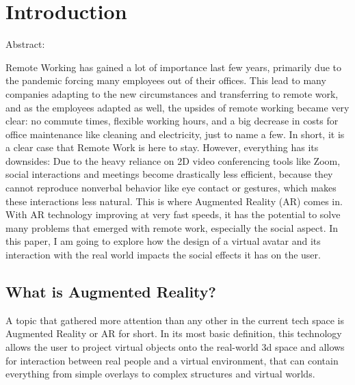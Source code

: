 \chapter{Introduction}
\label{sec::introduction}

Abstract:

Remote Working has gained a lot of importance last few years, primarily due to the pandemic forcing many employees out of their offices. This lead to many companies adapting to the new circumstances and transferring to remote work, and as the employees adapted as well, the upsides of remote working became very clear: no commute times, flexible working hours, and a big decrease in costs for office maintenance like cleaning and electricity, just to name a few. In short, it is a clear case that Remote Work is here to stay. However, everything has its downsides: Due to the heavy reliance on 2D video conferencing tools like Zoom, social interactions and meetings become drastically less efficient, because they cannot reproduce nonverbal behavior like eye contact or gestures, which makes these interactions less natural. This is where Augmented Reality (AR) comes in. With AR technology improving at very fast speeds, it has the potential to solve many problems that emerged with remote work, especially the social aspect. In this paper, I am going to explore how the design of a virtual avatar and its interaction with the real world impacts the social effects it has on the user.


\section{What is Augmented Reality?}

A topic that gathered more attention than any other in the current tech space is Augmented Reality or AR for short. In its most basic definition, this technology allows the user to project virtual objects onto the real-world 3d space and allows for interaction between real people and a virtual environment, that can contain everything from simple overlays to complex structures and virtual worlds. \cite{Carmigniani:2011te}

